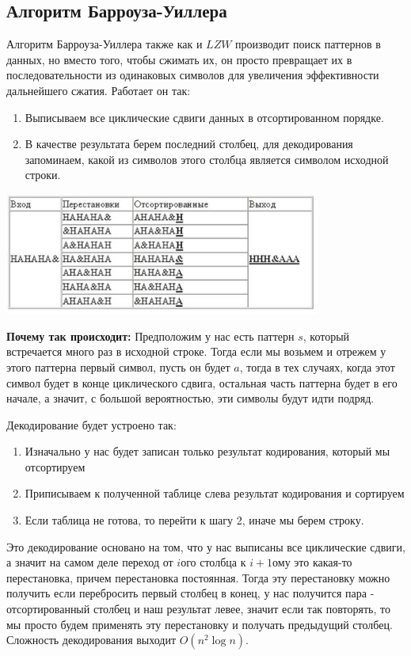 \documentclass{article}
\begin{document}
\subsection{Алгоритм Барроуза-Уиллера}
Алгоритм Барроуза-Уиллера также как и $LZW$ производит поиск паттернов в данных, но вместо того, чтобы сжимать их, он просто превращает их в последовательности из одинаковых символов для увеличения эффективности дальнейшего сжатия. Работает он так:
\begin{enumerate}
    \item Выписываем все циклические сдвиги данных в отсортированном порядке.
    \item В качестве результата берем последний столбец, для декодирования запоминаем, какой из символов этого столбца является символом исходной строки.
\end{enumerate} 
\begin{center}
  \includegraphics[height=4cm]{barr.jpg}
\end{center}
\textbf{Почему так происходит:} Предположим у нас есть паттерн $s$, который встречается много раз в исходной строке. Тогда если мы возьмем и отрежем у этого паттерна первый символ, пусть он будет $a$, тогда в тех случаях, когда этот символ будет в конце циклического сдвига, остальная часть паттерна будет в его начале, а значит, с большой вероятностью, эти символы будут идти подряд.

Декодирование будет устроено так:
\begin{enumerate}
    \item Изначально у нас будет записан только результат кодирования, который мы отсортируем
    \item Приписываем к полученной таблице слева результат кодирования и сортируем
    \item Если таблица не готова, то перейти к шагу 2, иначе мы берем строку.
\end{enumerate}
Это декодирование основано на том, что у нас выписаны все циклические сдвиги, а значит на самом деле переход от $i$ого столбца к $i+1$ому это какая-то перестановка, причем перестановка постоянная. Тогда эту перестановку можно получить если перебросить первый столбец в конец, у нас получится пара - отсортированный столбец и наш результат левее, значит если так повторять, то мы просто будем применять эту перестановку и получать предыдущий столбец. Сложность декодирования выходит $O(n^2\log n)$.
\end{document}
